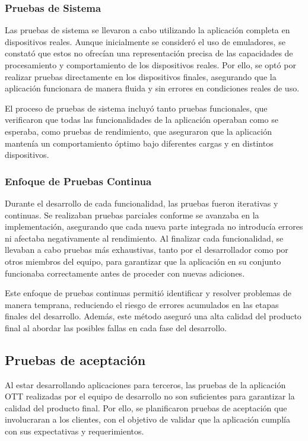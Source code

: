 \subsubsection{Pruebas de Sistema}
Las pruebas de sistema se llevaron a cabo utilizando la aplicación completa en dispositivos reales. Aunque inicialmente se consideró 
el uso de emuladores, se constató que estos no ofrecían una representación precisa de las capacidades de procesamiento y 
comportamiento de los dispositivos reales. Por ello, se optó por realizar pruebas directamente en los dispositivos finales, 
asegurando que la aplicación funcionara de manera fluida y sin errores en condiciones reales de uso.

El proceso de pruebas de sistema incluyó tanto pruebas funcionales, que verificaron que todas las funcionalidades de la
 aplicación operaban como se esperaba, como pruebas de rendimiento, que aseguraron que la aplicación mantenía un comportamiento 
 óptimo bajo diferentes cargas y en distintos dispositivos.

\subsubsection{Enfoque de Pruebas Continua}
Durante el desarrollo de cada funcionalidad, las pruebas fueron iterativas y continuas. Se realizaban pruebas parciales conforme 
se avanzaba en la implementación, asegurando que cada nueva parte integrada no introducía errores ni afectaba negativamente al 
rendimiento. Al finalizar cada funcionalidad, se llevaban a cabo pruebas más exhaustivas, tanto por el desarrollador como por 
otros miembros del equipo, para garantizar que la aplicación en su conjunto funcionaba correctamente antes de proceder con nuevas adiciones.

Este enfoque de pruebas continuas permitió identificar y resolver problemas de manera temprana, reduciendo el riesgo de errores 
acumulados en las etapas finales del desarrollo. Además, este método aseguró una alta calidad del producto final al abordar las 
posibles fallas en cada fase del desarrollo.

\subsection{Pruebas de aceptación}
\label{subsec:pruebas_aceptacion}

Al estar desarrollando aplicaciones para terceros, las pruebas de la aplicación OTT realizadas por el equipo de desarrollo no son suficientes
para garantizar la calidad del producto final. Por ello, se planificaron pruebas de aceptación que involucraran a los
clientes, con el objetivo de validar que la aplicación cumplía con sus expectativas y requerimientos.


